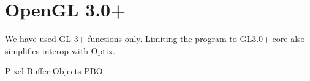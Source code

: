 \part{OpenGL 3.0+}

We have used GL 3+ functions only. Limiting the program to GL3.0+ core also simplifies interop with Optix.

Pixel Buffer Objects PBO